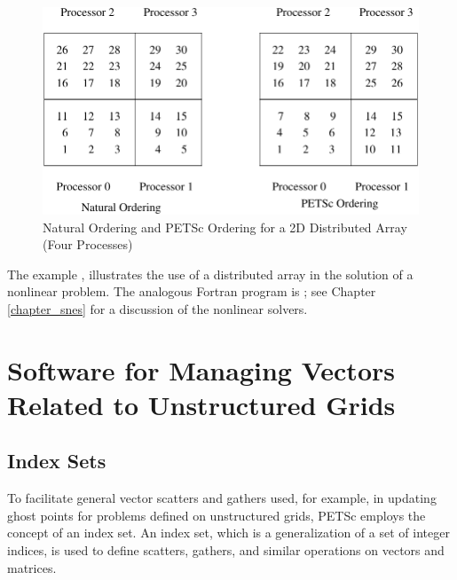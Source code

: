 \begin{figure}[tb]
\centerline{ \includegraphics{danumbering}}
\caption{Natural Ordering and PETSc Ordering for a 2D Distributed Array (Four Processes)}
\label{fig_daao}
\end{figure}

The example
,
illustrates the use of a distributed array in the solution of
a nonlinear problem.  The analogous Fortran program is
\break {};
see Chapter \ref{chapter_snes} for a discussion of the nonlinear
solvers.


\section{Software for Managing Vectors Related to Unstructured Grids}
\label{sec_unstruct}

\subsection{Index Sets} 
\label{sec_indexset}

To facilitate general vector scatters and gathers used, for example, in updating 
ghost points for problems defined on unstructured grids, PETSc employs the 
concept of an index set.  An index set, which is a generalization of a 
set of integer indices, is used to define scatters, gathers, and similar 
operations on vectors and matrices. 

